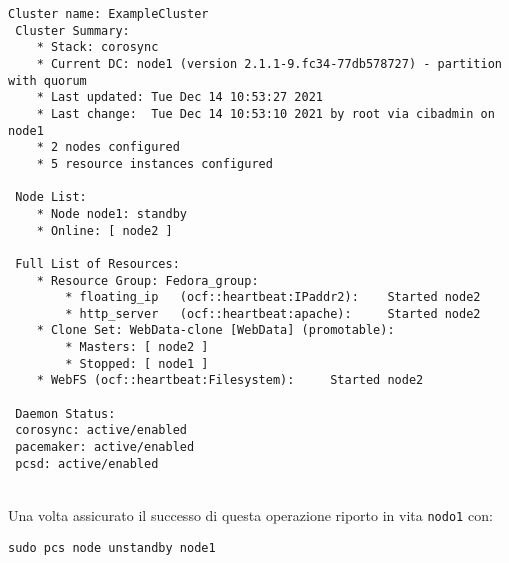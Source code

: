 \begin{lstlisting}[style=output]
 Cluster name: ExampleCluster
 Cluster Summary:
    * Stack: corosync
    * Current DC: node1 (version 2.1.1-9.fc34-77db578727) - partition with quorum
    * Last updated: Tue Dec 14 10:53:27 2021
    * Last change:  Tue Dec 14 10:53:10 2021 by root via cibadmin on node1
    * 2 nodes configured
    * 5 resource instances configured

 Node List:
    * Node node1: standby
    * Online: [ node2 ]

 Full List of Resources:
    * Resource Group: Fedora_group:
        * floating_ip	(ocf::heartbeat:IPaddr2):	 Started node2
        * http_server	(ocf::heartbeat:apache):	 Started node2
    * Clone Set: WebData-clone [WebData] (promotable):
        * Masters: [ node2 ]
        * Stopped: [ node1 ]
    * WebFS	(ocf::heartbeat:Filesystem):	 Started node2

 Daemon Status:
 corosync: active/enabled
 pacemaker: active/enabled
 pcsd: active/enabled
\end{lstlisting}
\ \\
Una volta assicurato il successo di questa operazione riporto in vita \lstinline[style=cmd]|nodo1| con:

\begin{lstlisting}[style=cmd]
 sudo pcs node unstandby node1
\end{lstlisting}
